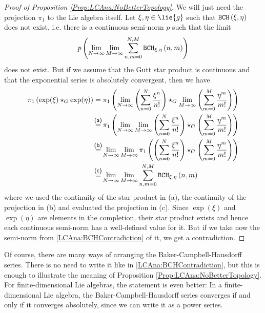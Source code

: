 \begin{proof}[Proof of Proposition \ref{Prop:LCAna:NoBetterTopology}]
	We will just need the projection $\pi_1$ to the Lie algebra itself. Let 
	$\xi, \eta \in \lie{g}$ such that $\mathtt{BCH}\left(\xi, \eta\right)$ does not exist, i.e.
	there is a continuous semi-norm $p$ such that the limit
	\begin{equation}\label{LCAna:BCHContradiction}
		p \left(
			\lim_{N \rightarrow \infty}
			\lim_{M \rightarrow \infty}		
			\sum\limits_{n,m = 0}^{N,M}
			\mathtt{BCH}_{\xi, \eta}\left(n, m\right)
		\right)				
	\end{equation}
	does not exist. But if we assume that the Gutt star product is continuous
	and that the exponential series is absolutely convergent, then we have
	\begin{align*}
	\pi_1 \left( \exp(\xi) \star_G \exp(\eta) \right)
	& =
	\pi_1
	\left(
		\lim_{N \rightarrow \infty}
		\left(
			\sum\limits_{n=0}^N
			\frac{\xi^n}{n!}
		\right)
		\star_G
		\lim_{M \rightarrow \infty}
		\left(
			\sum\limits_{m=0}^M
			\frac{\eta^m}{m!}
		\right)
	\right)
	\\
	& \ot{(a)}{=}
	\pi_1
	\left(
		\lim_{N \rightarrow \infty}
		\lim_{M \rightarrow \infty}
		\left(
			\sum\limits_{n=0}^N
			\frac{\xi^n}{n!}
		\right)
		\star_G
		\left(
			\sum\limits_{m=0}^M
			\frac{\eta^m}{m!}
		\right)
	\right)
	\\
	& \ot{(b)}{=}
	\lim_{N \rightarrow \infty}
	\lim_{M \rightarrow \infty}
	\pi_1
	\left(	
		\left(
			\sum\limits_{n=0}^N
			\frac{\xi^n}{n!}
		\right)
		\star_G
		\left(
			\sum\limits_{m=0}^M
			\frac{\eta^m}{m!}
		\right)
	\right)
	\\
	& \ot{(c)}{=}
	\lim_{N \rightarrow \infty}
	\lim_{M \rightarrow \infty}
	\sum\limits_{n,m=0}^{N, M}
	\bchparts{\xi}{\eta}{n}{m}
	\end{align*}
	where we used the continuity of the star product in (a), the continuity of 
	the projection in (b) and evaluated the projection in (c). Since 
	$\exp(\xi)$ and $\exp(\eta)$ are elements in the completion, their star 
	product exists and hence each continuous semi-norm has a well-defined 
	value for it. But if we take now the semi-norm from 
	\eqref{LCAna:BCHContradiction} of it, we get a contradiction.
\end{proof}
Of course, there are many ways of arranging the Baker-Campbell-Hausdorff 
series. There is no need to write it like in \eqref{LCAna:BCHContradiction}, 
but this is enough to illustrate the meaning of Proposition 
\ref{Prop:LCAna:NoBetterTopology}. For finite-dimensional Lie algebras, the 
statement is even better: In a finite-dimensional Lie algebra, the 
Baker-Campbell-Hausdorff series converges if and only if it converges 
absolutely, since we can write it as a power series.



